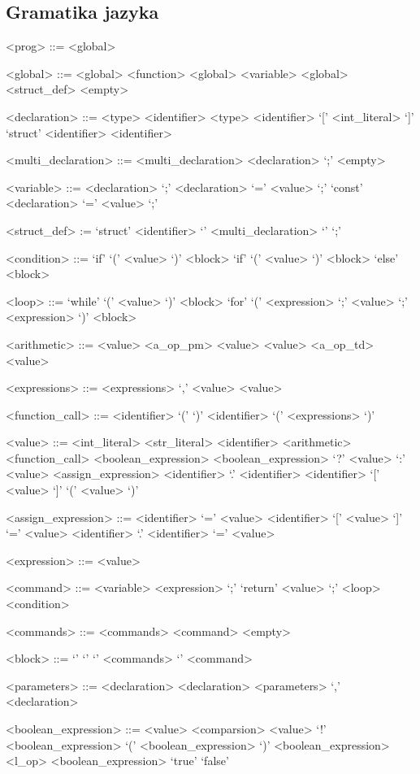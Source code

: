 \documentclass[12pt, a4paper]{article}
\begin{document}
\subsection{Gramatika jazyka}
\begin{grammar}

<prog> ::= <global>

<global> ::= <global> <function>
\alt <global> <variable>
\alt <global> <struct\_def>
\alt <empty>

<declaration> ::= <type> <identifier>
\alt  <type> <identifier> `[' <int\_literal> `]'
\alt  `struct' <identifier> <identifier>


<multi\_declaration> ::= <multi\_declaration> <declaration> `;'
\alt <empty>

<variable> ::= <declaration> `;'
\alt <declaration> `=' <value> `;'
\alt `const' <declaration> `=' <value> `;'

<struct\_def> := `struct' <identifier> `{' <multi\_declaration> `}' `;'

<condition> ::= `if' `(' <value> `)' <block>
\alt `if' `(' <value> `)' <block> `else' <block>

<loop> ::= `while' `(' <value> `)' <block>
\alt `for' `(' <expression> `;' <value> `;' <expression> `)' <block>

<arithmetic> ::= <value> <a\_op\_pm> <value>
\alt <value> <a\_op\_td> <value>

<expressions> ::= <expressions> `,' <value>
\alt <value>

<function\_call> ::= <identifier> `(' `)'
\alt <identifier> `(' <expressions> `)'

<value> ::= <int\_literal>
\alt <str\_literal>
\alt <identifier>
\alt <arithmetic>
\alt <function\_call>
\alt <boolean\_expression>
\alt <boolean\_expression> `?' <value>  `:' <value>
\alt <assign\_expression>
\alt <identifier> `.' <identifier>
\alt <identifier> `[' <value> `]'
\alt `(' <value> `)'

<assign\_expression> ::= <identifier> `=' <value>
\alt <identifier> `[' <value> `]' `=' <value>
\alt <identifier> `.' <identifier> `=' <value>

<expression> ::= <value>

<command> ::= <variable>
\alt <expression> `;'
\alt `return' <value> `;'
\alt <loop>
\alt <condition>

<commands> ::= <commands> <command>
\alt <empty>

<block> ::= `{' `}'
\alt `{' <commands> `}' 
\alt <command>

<parameters> ::= <declaration>
\alt <declaration>
\alt <parameters> `,' <declaration>

<boolean\_expression> ::= <value> <comparsion> <value>
\alt `!' <boolean\_expression>
\alt `(' <boolean\_expression> `)'
\alt <boolean\_expression> <l\_op> <boolean\_expression>
\alt `true'
\alt `false'

\end{grammar}
\end{document}
